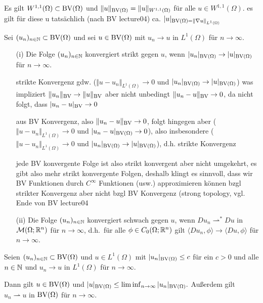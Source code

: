 \begin{remark}
  Es gilt $W^{1,1}(\Omega)\subset\textup{BV}(\Omega)$ und 
  $\Vert u \Vert_{\textup{BV}(\Omega)}=\Vert u \Vert_{W^{1,1}(\Omega)}$ für alle
  $u\in W^{1,1}(\Omega)$.
  {\color{red}es gilt für diese u tatsächlich (nach BV lecture04) ca.
  $|u|_{\textup{BV}(\Omega)=\Vert \nabla u \Vert_{L^1(\Omega)}}$}
\end{remark}

\begin{definition}
  Sei $(u_n)_{n\in\mathbb{N}}\subset \textup{BV}(\Omega)$ und sei $u\in \textup{BV}(\Omega)$ mit
  $u_n\rightarrow u$ in $L^1(\Omega)$ für $n\rightarrow\infty$.
  \begin{itemize}
    \item[(i)]
      Die Folge $(u_n)_{n\in\mathbb{N}}$ konvergiert strikt gegen $u$,
      wenn $|u_n|_{\textup{BV}(\Omega)}\rightarrow |u|_{\textup{BV}(\Omega)}$ für $n\rightarrow\infty$.
      {\color{red} strikte Konvergenz gdw. ($\Vert u-u_n\Vert_{L^1(\Omega)}
      \to 0$ und $|u_n|_{\textup{BV}(\Omega)}\rightarrow |u|_{\textup{BV}(\Omega)}$)
      was impliziert $\Vert u_n\Vert_{\textup{BV}}\to \Vert u\Vert_{\textup{BV}}$ aber nicht
      unbedingt $\Vert u_n - u \Vert_{\textup{BV}}\to 0$, da nicht folgt, dass 
      $|u_n - u|_{\textup{BV}}\to 0$
      
      aus BV Konvergenz, also $\Vert u_n - u \Vert_{\textup{BV}}\to 0$, folgt hingegen 
      aber ($\Vert u-u_n\Vert_{L^1(\Omega)}
      \to 0$ und $|u_n - u|_{\textup{BV}(\Omega)}\rightarrow 0$), also insbesondere
      ($\Vert u-u_n\Vert_{L^1(\Omega)}
      \to 0$ und $|u_n|_{\textup{BV}(\Omega)}\rightarrow |u|_{\textup{BV}(\Omega)}$), d.h.
      strikte Konvergenz
      
      jede BV konvergente Folge ist also strikt konvergent aber nicht umgekehrt,
      es gibt also mehr strikt konvergente Folgen, deshalb klingt es sinnvoll,
      dass wir BV Funktionen durch $C^\infty$ Funktionen (usw.) approximieren
      können bzgl strikter Konvergenz aber nicht bzgl BV Konvergenz (strong 
      topology, vgl.  Ende von BV lecture04}
    \item[(ii)] Die Folge $(u_n)_{n\in\mathbb{N}}$ konvergiert
      schwach gegen $u$, wenn
      $Du_n\rightharpoonup^\ast Du$ in 
      $\mathcal{M}(\Omega;\mathbb{R}^n)$ für $n\rightarrow\infty$, d.h.\ für alle
      $\phi\in C_0(\Omega;\mathbb{R}^n)$ gilt 
      $\langle Du_n,\phi\rangle\rightarrow \langle Du,\phi\rangle$ für 
      $n\rightarrow\infty$.
  \end{itemize}
\end{definition}

\begin{theorem}
  \label{thm:wlsc}
  Seien $(u_n)_{n\in\mathbb{N}}\subset\textup{BV}(\Omega)$ und $u\in L^1(\Omega)$ mit
  $|u_n|_{\textup{BV}(\Omega)}\leq c$ für ein $c>0$ und alle $n\in\mathbb{N}$ und
  $u_n\rightarrow u$ in $L^1(\Omega)$ für $n\rightarrow\infty$.

  Dann gilt $u\in\textup{BV}(\Omega)$ und $|u|_{\textup{BV}(\Omega)}\leq
  \liminf_{n\rightarrow\infty}|u_n|_{\textup{BV}(\Omega)}.$
  Außerdem gilt $u_n\rightharpoonup u$ in $\textup{BV}(\Omega)$ für $n\rightarrow
  \infty$.
\end{theorem}

